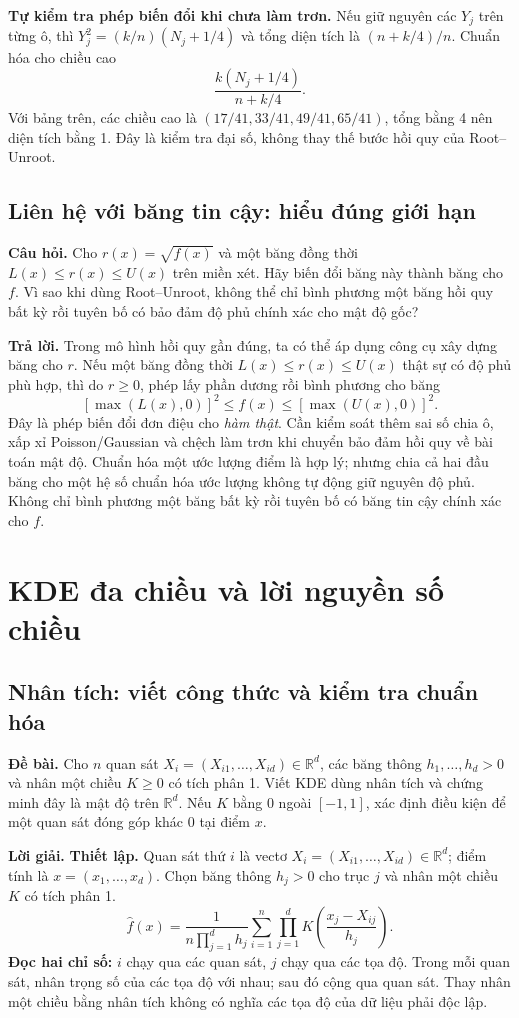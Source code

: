 \documentclass[11pt,a4paper]{article}
\newcommand{\R}{\mathbb R}
\begin{document}
\textbf{Tự kiểm tra phép biến đổi khi chưa làm trơn.} Nếu giữ nguyên các $Y_j$ trên từng ô, thì $Y_j^2=(k/n)(N_j+1/4)$ và tổng diện tích là $(n+k/4)/n$. Chuẩn hóa cho chiều cao
\[
\frac{k(N_j+1/4)}{n+k/4}.
\]
Với bảng trên, các chiều cao là $(17/41,33/41,49/41,65/41)$, tổng bằng 4 nên diện tích bằng 1. Đây là kiểm tra đại số, không thay thế bước hồi quy của Root--Unroot.

\subsection{Liên hệ với băng tin cậy: hiểu đúng giới hạn}
\textbf{Câu hỏi.} Cho $r(x)=\sqrt{f(x)}$ và một băng đồng thời
$L(x)\leq r(x)\leq U(x)$ trên miền xét.
Hãy biến đổi băng này thành băng cho $f$.
Vì sao khi dùng Root--Unroot, không thể chỉ bình phương một băng hồi quy bất kỳ
rồi tuyên bố có bảo đảm độ phủ chính xác cho mật độ gốc?

\textbf{Trả lời.}
Trong mô hình hồi quy gần đúng, ta có thể áp dụng công cụ xây dựng băng cho $r$. Nếu một băng đồng thời $L(x)\leq r(x)\leq U(x)$ thật sự có độ phủ phù hợp, thì do $r\geq0$, phép lấy phần dương rồi bình phương cho băng
\[
[\max(L(x),0)]^2\leq f(x)\leq[\max(U(x),0)]^2.
\]
Đây là phép biến đổi đơn điệu cho \emph{hàm thật}. Cần kiểm soát thêm sai số chia ô, xấp xỉ Poisson/Gaussian và chệch làm trơn khi chuyển bảo đảm hồi quy về bài toán mật độ. Chuẩn hóa một ước lượng điểm là hợp lý; nhưng chia cả hai đầu băng cho một hệ số chuẩn hóa ước lượng không tự động giữ nguyên độ phủ. Không chỉ bình phương một băng bất kỳ rồi tuyên bố có băng tin cậy chính xác cho $f$.


\section{KDE đa chiều và lời nguyền số chiều}\label{sec:multivariate}
\subsection{Nhân tích: viết công thức và kiểm tra chuẩn hóa}
\textbf{Đề bài.} Cho $n$ quan sát $X_i=(X_{i1},\ldots,X_{id})\in\R^d$,
các băng thông $h_1,\ldots,h_d>0$ và nhân một chiều $K\geq0$ có tích phân 1.
Viết KDE dùng nhân tích và chứng minh đây là mật độ trên $\R^d$.
Nếu $K$ bằng 0 ngoài $[-1,1]$, xác định điều kiện để một quan sát đóng góp khác 0 tại điểm $x$.

\textbf{Lời giải.}
\textbf{Thiết lập.} Quan sát thứ $i$ là vectơ $X_i=(X_{i1},\ldots,X_{id})\in\R^d$; điểm tính là $x=(x_1,\ldots,x_d)$. Chọn băng thông $h_j>0$ cho trục $j$ và nhân một chiều $K$ có tích phân 1.
\[
\boxed{\widehat f(x)=\frac1{n\prod_{j=1}^dh_j}
\sum_{i=1}^n\prod_{j=1}^dK\!\left(\frac{x_j-X_{ij}}{h_j}\right).}
\]
\textbf{Đọc hai chỉ số:} $i$ chạy qua các quan sát, $j$ chạy qua các tọa độ. Trong mỗi quan sát, nhân trọng số của các tọa độ với nhau; sau đó cộng qua quan sát. Thay nhân một chiều bằng nhân tích không có nghĩa các tọa độ của dữ liệu phải độc lập.
\end{document}
